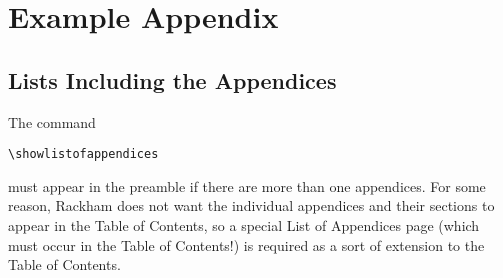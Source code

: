 \chapter{Example Appendix}

\section{Lists Including the Appendices}
The command
\begin{verbatim}
\showlistofappendices
\end{verbatim}
must appear in the preamble if there are more than one appendices.  For
some reason, Rackham does not want the individual appendices and their
sections to appear in the Table of Contents, so a special List of
Appendices page (which must occur in the Table of Contents!) is required
as a sort of extension to the Table of Contents.

\nocite{*}

